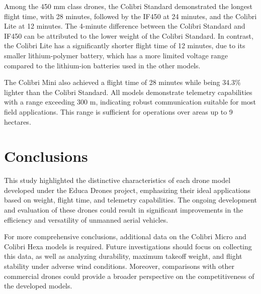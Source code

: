 \documentclass[conference]{IEEEtran}
\begin{document}
Among the 450 mm class drones, the Colibri Standard demonstrated the longest flight time, with 28 minutes, followed by the IF450 at 24 minutes, and the Colibri Lite at 12 minutes. The 4-minute difference between the Colibri Standard and IF450 can be attributed to the lower weight of the Colibri Standard. In contrast, the Colibri Lite has a significantly shorter flight time of 12 minutes, due to its smaller lithium-polymer battery, which has a more limited voltage range compared to the lithium-ion batteries used in the other models.

The Colibri Mini also achieved a flight time of 28 minutes while being 34.3\% lighter than the Colibri Standard. All models demonstrate telemetry capabilities with a range exceeding 300 m, indicating robust communication suitable for most field applications. This range is sufficient for operations over areas up to 9 hectares.

\section*{Conclusions}

This study highlighted the distinctive characteristics of each drone model developed under the Educa Drones project, emphasizing their ideal applications based on weight, flight time, and telemetry capabilities. The ongoing development and evaluation of these drones could result in significant improvements in the efficiency and versatility of unmanned aerial vehicles.

For more comprehensive conclusions, additional data on the Colibri Micro and Colibri Hexa models is required. Future investigations should focus on collecting this data, as well as analyzing durability, maximum takeoff weight, and flight stability under adverse wind conditions. Moreover, comparisons with other commercial drones could provide a broader perspective on the competitiveness of the developed models.
\end{document}
